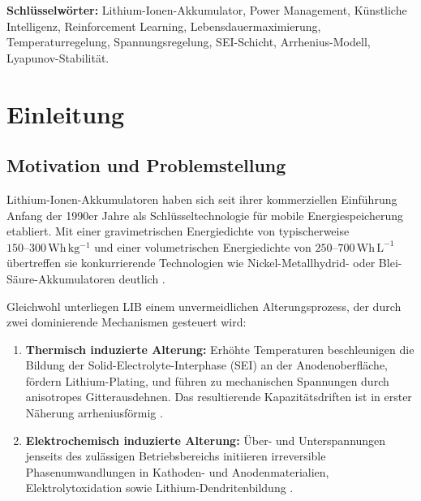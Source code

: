 ﻿\documentclass[12pt,a4paper]{article}
\begin{document}
	\vspace{1cm}
	\noindent\textbf{Schlüsselwörter:} Lithium-Ionen-Akkumulator, Power Management,
	Künstliche Intelligenz, Reinforcement Learning, Lebensdauermaximierung,
	Temperaturregelung, Spannungsregelung, SEI-Schicht, Arrhenius-Modell, Lyapunov-Stabilität.
	
	\newpage
	\tableofcontents
	\newpage
	
	\section{Einleitung}
	
	\subsection{Motivation und Problemstellung}
	
	Lithium-Ionen-Akkumulatoren haben sich seit ihrer kommerziellen Einführung Anfang
	der 1990er Jahre als Schlüsseltechnologie für mobile Energiespeicherung etabliert.
	Mit einer gravimetrischen Energiedichte von typischerweise
	$150\text{--}300\,\mathrm{Wh\,kg^{-1}}$ und einer volumetrischen Energiedichte
	von $250\text{--}700\,\mathrm{Wh\,L^{-1}}$ übertreffen sie konkurrierende
	Technologien wie Nickel-Metallhydrid- oder Blei-Säure-Akkumulatoren deutlich
	\cite{Tarascon2001}.
	
	Gleichwohl unterliegen LIB einem unvermeidlichen Alterungsprozess, der durch
	zwei dominierende Mechanismen gesteuert wird:
	
	\begin{enumerate}[leftmargin=*, label=(\arabic*)]
		\item \textbf{Thermisch induzierte Alterung:} Erhöhte Temperaturen beschleunigen
		die Bildung der Solid-Electrolyte-Interphase (SEI) an der Anodenoberfläche,
		fördern Lithium-Plating, und führen zu mechanischen Spannungen durch
		anisotropes Gitterausdehnen. Das resultierende Kapazitätsdriften ist
		in erster Näherung arrheniusförmig \cite{Wang2011}.
		
		\item \textbf{Elektrochemisch induzierte Alterung:} Über- und Unterspannungen
		jenseits des zulässigen Betriebsbereichs initiieren irreversible Phasenumwandlungen
		in Kathoden- und Anodenmaterialien, Elektrolytoxidation sowie Lithium-Dendritenbildung
		\cite{Aurbach2002}.
	\end{enumerate}
	
\end{document}
